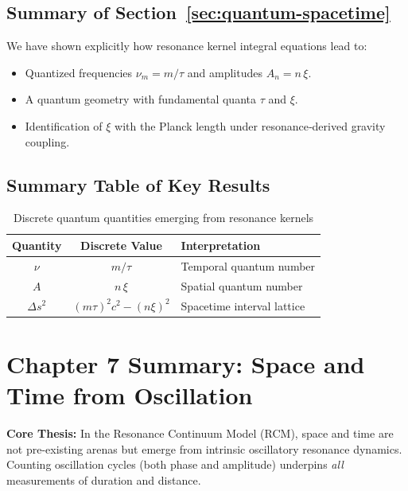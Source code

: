 \subsection{Summary of Section~\ref{sec:quantum-spacetime}}
\label{sec:quantum-summary}

We have shown explicitly how resonance kernel integral equations lead to:
\begin{itemize}
  \item Quantized frequencies \(\nu_m = m/\tau\) and amplitudes \(A_n = n\,\xi\).
  \item A quantum geometry with fundamental quanta \(\tau\) and \(\xi\).
  \item Identification of \(\xi\) with the Planck length under resonance‐derived gravity coupling.
\end{itemize}

\subsection{Summary Table of Key Results}
\label{sec:quantum-summary-table}

\begin{table}[h]
  \centering
  \caption{Discrete quantum quantities emerging from resonance kernels}
  \begin{tabular}{c|c|l}
    \textbf{Quantity} & \textbf{Discrete Value} & \textbf{Interpretation} \\\hline
    \(\nu\)           & \(m/\tau\)              & Temporal quantum number \\
    \(A\)             & \(n\,\xi\)              & Spatial quantum number \\
    \(\Delta s^2\)    & \((m\tau)^2c^2-(n\xi)^2\) & Spacetime interval lattice \\
  \end{tabular}
\end{table}

\section{Chapter 7 Summary: Space and Time from Oscillation}

\textbf{Core Thesis:}  
In the Resonance Continuum Model (RCM), space and time are not pre-existing arenas but emerge from intrinsic oscillatory resonance dynamics. Counting oscillation cycles (both phase and amplitude) underpins \emph{all} measurements of duration and distance.

